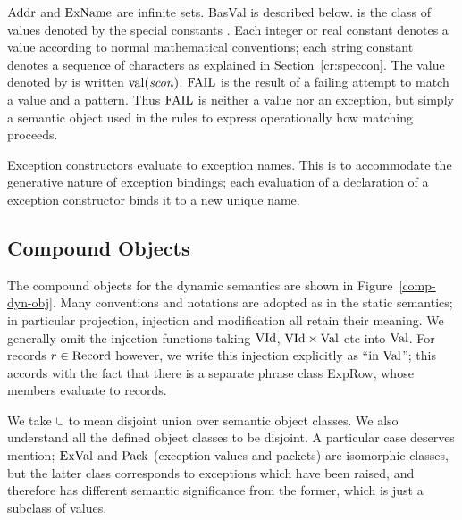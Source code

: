 ${\rm Addr}$ and ${\rm ExName}$ are infinite sets. BasVal is described below.
{\SVal} is the class of values denoted by the special constants
\SCon. Each integer or real constant denotes a value according to normal
mathematical conventions; each string 
constant denotes a sequence of characters as explained in Section~\ref{cr:speccon}. The value denoted
by {\scon} is written $\mathop{\rm val}\nolimits({\it scon})$.
${\rm FAIL}$ is the result of a failing attempt to match a value and a
pattern. Thus ${\rm FAIL}$ is neither a value nor an exception, but simply
a semantic object used in the rules to express operationally
how matching proceeds.

Exception constructors evaluate to exception names.
This is to accommodate the generative
nature of exception bindings; each evaluation of a declaration of a
exception constructor binds it to a new unique name.

\subsection{Compound Objects}

The compound objects for the dynamic semantics are
shown in Figure~\ref{comp-dyn-obj}.
Many conventions and notations are adopted as in the static semantics; in
particular projection, injection and modification all retain
their meaning.
We generally omit the injection functions taking ${\rm VId}$,
${\rm VId}\times{\rm Val}$ etc into ${\rm Val}$.
For records $r\in{\rm Record}$ however,
we write this injection explicitly as ``$\mbox{\rm in}\ {\rm Val}$''; this accords with
the fact that there is a separate phrase class ExpRow, whose members
evaluate to records.

We take $\cup$ to mean disjoint union over
semantic object classes. We also understand all the defined object
classes to be disjoint. A particular case deserves mention; ${\rm ExVal}$
and ${\rm Pack}$ (exception values and packets) are isomorphic classes,
but the latter class corresponds to exceptions which have been
raised, and therefore has different semantic significance from the
former, which is just a subclass of values.



